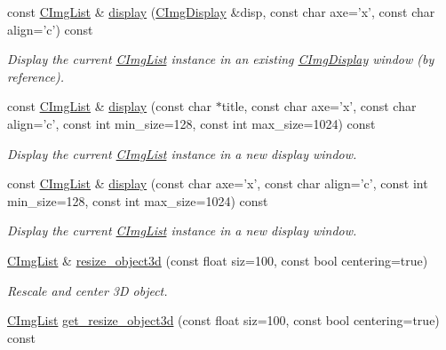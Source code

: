 \begin{DoxyCompactItemize}
\item 
const \hyperlink{structcimg__library_1_1_c_img_list}{CImgList} \& \hyperlink{structcimg__library_1_1_c_img_list_a2614afd15e45653cbeb6d3626c7492b3}{display} (\hyperlink{structcimg__library_1_1_c_img_display}{CImgDisplay} \&disp, const char axe='x', const char align='c') const 
\begin{DoxyCompactList}\small\item\em Display the current \hyperlink{structcimg__library_1_1_c_img_list}{CImgList} instance in an existing \hyperlink{structcimg__library_1_1_c_img_display}{CImgDisplay} window (by reference). \item\end{DoxyCompactList}\item 
const \hyperlink{structcimg__library_1_1_c_img_list}{CImgList} \& \hyperlink{structcimg__library_1_1_c_img_list_ab70034a7d4598b77f1ba224d6352abcf}{display} (const char $\ast$title, const char axe='x', const char align='c', const int min\_\-size=128, const int max\_\-size=1024) const 
\begin{DoxyCompactList}\small\item\em Display the current \hyperlink{structcimg__library_1_1_c_img_list}{CImgList} instance in a new display window. \item\end{DoxyCompactList}\item 
const \hyperlink{structcimg__library_1_1_c_img_list}{CImgList} \& \hyperlink{structcimg__library_1_1_c_img_list_aa3cc5a6e7807c7d0ec875813cccd2948}{display} (const char axe='x', const char align='c', const int min\_\-size=128, const int max\_\-size=1024) const 
\begin{DoxyCompactList}\small\item\em Display the current \hyperlink{structcimg__library_1_1_c_img_list}{CImgList} instance in a new display window. \item\end{DoxyCompactList}\item 
\hypertarget{structcimg__library_1_1_c_img_list_ab06fb543286625d3cbde97d46d6030fe}{
\hyperlink{structcimg__library_1_1_c_img_list}{CImgList} \& \hyperlink{structcimg__library_1_1_c_img_list_ab06fb543286625d3cbde97d46d6030fe}{resize\_\-object3d} (const float siz=100, const bool centering=true)}
\label{structcimg__library_1_1_c_img_list_ab06fb543286625d3cbde97d46d6030fe}

\begin{DoxyCompactList}\small\item\em Rescale and center 3D object. \item\end{DoxyCompactList}\item 
\hypertarget{structcimg__library_1_1_c_img_list_a3af9e80e514673d1340fcc34ce7fa3e6}{
\hyperlink{structcimg__library_1_1_c_img_list}{CImgList} \hyperlink{structcimg__library_1_1_c_img_list_a3af9e80e514673d1340fcc34ce7fa3e6}{get\_\-resize\_\-object3d} (const float siz=100, const bool centering=true) const }
\label{structcimg__library_1_1_c_img_list_a3af9e80e514673d1340fcc34ce7fa3e6}


\end{DoxyCompactItemize}

